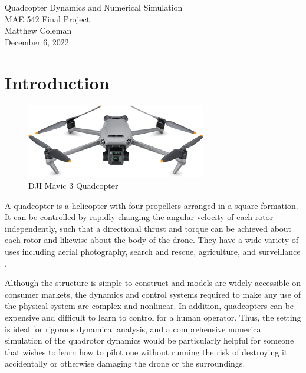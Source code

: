 \documentclass{article}
\makeatletter
\newcommand*{\toccontents}{\@starttoc{toc}}
\makeatother
\begin{document}
\begin{center}
    \Large Quadcopter Dynamics and Numerical Simulation \\
    \large MAE 542 Final Project \\
    \vspace{0.5em}
    \small Matthew Coleman \\
    \small December 6, 2022
\end{center}

\toccontents

\newpage
\section{Introduction}

\begin{figure}[H]
    \centering
    \includegraphics[width=0.7\textwidth]{proposal/quadcopter.jpg}
    \caption{DJI Mavic 3 Quadcopter}
    \label{fig:quadcopter_img}
\end{figure}

A quadcopter is a helicopter with four propellers arranged in a square formation. It can be controlled by rapidly changing the angular velocity of each rotor independently, such that a directional thrust and torque can be achieved about each rotor and likewise about the body of the drone. They have a wide variety of uses including aerial photography, search and rescue, agriculture, and surveillance \cite{luukkonen2011modelling}.

Although the structure is simple to construct and models are widely accessible on consumer markets, the dynamics and control systems required to make any use of the physical system are complex and nonlinear. In addition, quadcopters can be expensive and difficult to learn to control for a human operator. Thus, the setting is ideal for rigorous dynamical analysis, and a comprehensive numerical simulation of the quadrotor dynamics would be particularly helpful for someone that wishes to learn how to pilot one without running the risk of destroying it accidentally or otherwise damaging the drone or the surroundings.
\end{document}
